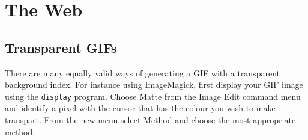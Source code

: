 \documentclass[twoside,11pt]{article}
\newcommand{\htmlref}[2]{#1}
\newcommand{\xlabel}[1]{}
\begin{document}



\section{\xlabel{sc15_web}The Web\label{sc15_web}}





\subsection{\xlabel{sc15_transpart}Transparent GIFs\label{sc15_transparent}}

There are many equally valid ways of generating a  GIF with a transparent background index. For instance using \htmlref{ImageMagick}{sc15_magick}, first display your GIF image using the {\tt display} program. Choose {\sc Matte} from the {\sc Image Edit} command menu and identify a pixel with the cursor that has the colour you wish to make transpart. From the new menu select {\sc Method} and choose the most appropriate method:
\end{document}
